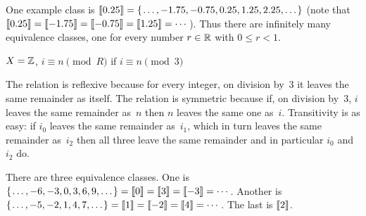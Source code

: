 \documentclass{ibl}  %
\begin{document}
\begin{problem}[\midlength]
\begin{exes}
\begin{answer}
  One example class is 
  $\llbracket 0.25 \rrbracket=\mbox{$\{\hspace{0.1em}\ldots,-1.75,-0.75,0.25,1.25,2.25,\ldots\hspace{0.1em}\}$}$
  (note that 
  $\llbracket 0.25 \rrbracket=\llbracket -1.75 \rrbracket=\llbracket -0.75 \rrbracket=\llbracket 1.25 \rrbracket=\cdots$).
  Thus there are infinitely many equivalence classes, one for every
  number $r\in\mathbb{R}$ with $0\leq r<1$.  
\end{answer}
\begin{exercise} 
     $X=\mathbb{Z}$, $i\equiv n \pmod R$ if 
      $i\equiv n\pmod 3$
\end{exercise}
\begin{answer}
  The relation is reflexive because for every integer, 
  on division by~$3$ it leaves the same remainder as itself.
  The relation is symmetric because if, on division by~$3$, 
  $i$ leaves the same remainder as~$n$
  then $n$ leaves the same one as~$i$.
  Transitivity is as easy: if $i_0$ leaves the same remainder as~$i_1$,
  which in turn leaves the same remainder as~$i_2$ then all three leave
  the same remainder and in particular $i_0$ and~$i_2$ do. 

  There are three equivalence classes.
  One is 
  $\mbox{$\{\hspace{0.1em}\ldots,-6,-3,0,3,6,9,\ldots\hspace{0.1em}\}$}=\llbracket 0 \rrbracket=\llbracket 3 \rrbracket=\llbracket -3 \rrbracket=\cdots$.
  Another is 
  $\mbox{$\{\hspace{0.1em}\ldots,-5,-2,1,4,7,\ldots\hspace{0.1em}\}$}=\llbracket 1 \rrbracket=\llbracket -2 \rrbracket=\llbracket 4 \rrbracket=\cdots$.
  The last is $\llbracket 2 \rrbracket$.
\end{answer}
\end{exes}
\end{problem}
\end{document}
